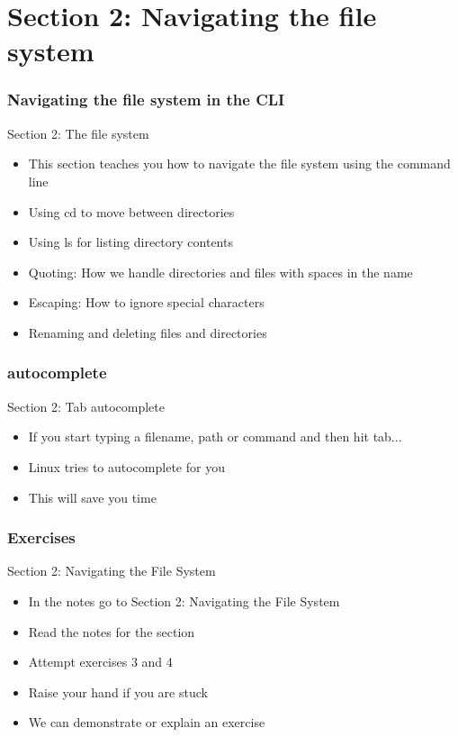 \part{Section 2: Navigating the file system}
\begin{frame}
\partpage
\end{frame}

\section{Navigating the file system in the CLI}
\begin{frame}{Section 2: The file system}
\begin{itemize}
\item This section teaches you how to navigate the file system using the command line
\item Using cd to move between directories
\item Using ls for listing directory contents
\item Quoting: How we handle directories and files with spaces in the name
\item Escaping: How to ignore special characters
\item Renaming and deleting files and directories
\end{itemize}
\end{frame}

\section{autocomplete}
\begin{frame}{Section 2: Tab autocomplete}
\begin{itemize}
\item If you start typing a filename, path or command and then hit tab...
\item Linux tries to autocomplete for you
\item This will save you time
\end{itemize}
\end{frame}

\section{Exercises}
\begin{frame}{Section 2: Navigating the File System}
\begin{itemize}
\item In the notes go to Section 2: Navigating the File System
\item Read the notes for the section 
\item Attempt exercises 3 and 4
\item Raise your hand if you are stuck
\item We can demonstrate or explain an exercise
\end{itemize}
\end{frame}

